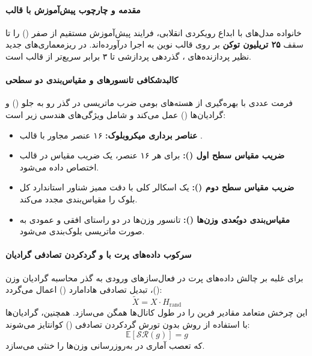 \item {}

\paragraph*{مقدمه و چارچوب پیش‌آموزش با قالب }
خانواده مدل‌های  \cite{nvidia2025nemotron3} با ابداع رویکردی انقلابی، فرایند پیش‌آموزش مستقیم از صفر () را تا سقف \textbf{۲۵ تریلیون توکن} بر روی قالب نوین \textbf{} به اجرا درآورده‌اند. در ریزمعماری‌های جدید نظیر پردازنده‌های ، گذردهی پردازشی  تا ۳ برابر سریع‌تر از قالب  است.

\paragraph*{کالبدشکافی تانسورهای  و مقیاس‌بندی دو سطحی}
فرمت عددی  با بهره‌گیری از هسته‌های بومی ضرب ماتریسی در گذر رو به جلو () و گرادیان‌ها () عمل می‌کند و شامل ویژگی‌های هندسی زیر است:
\begin{itemize}
    \item \textbf{عناصر برداری میکروبلوک:} ۱۶ عنصر مجاور با قالب .
    \item \textbf{ضریب مقیاس سطح اول ():} برای هر ۱۶ عنصر، یک ضریب مقیاس در قالب  اختصاص داده می‌شود.
    \item \textbf{ضریب مقیاس سطح دوم ():} یک اسکالر کلی با دقت ممیز شناور استاندارد  کل بلوک را مقیاس‌بندی مجدد می‌کند.
    \item \textbf{مقیاس‌بندی دوبُعدی وزن‌ها ():} تانسور وزن‌ها در دو راستای افقی و عمودی به صورت ماتریسی بلوک‌بندی می‌شود.
\end{itemize}

\paragraph*{سرکوب داده‌های پرت با  و گردکردن تصادفی گرادیان}
برای غلبه بر چالش داده‌های پرت در فعال‌سازهای ورودی به گذر محاسبه گرادیان وزن ()، تبدیل تصادفی هادامارد () اعمال می‌گردد:
\begin{equation}
    \tilde{X} = X \cdot H_{\text{rand}}
\end{equation}
این چرخش متعامد مقادیر فرین را در طول کانال‌ها همگن می‌سازد. همچنین، گرادیان‌ها با استفاده از روش بدون تورش گردکردن تصادفی () کوانتایز می‌شوند:
\begin{equation}
    \mathbb{E}[\mathcal{S}\mathcal{R}(g)] = g
\end{equation}
که تعصب آماری در به‌روزرسانی وزن‌ها را خنثی می‌سازد.

